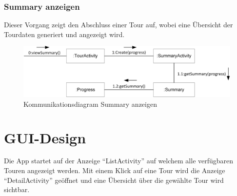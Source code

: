 \documentclass[a4paper,10pt,xetex]{article}
\begin{document}
\subsubsection{Summary anzeigen}
Dieser Vorgang zeigt den Abschluss einer Tour auf, wobei eine Übersicht der Tourdaten
generiert und angezeigt wird.
\begin{figure}
  \includegraphics{Kommunikationsdiagramm_SummaryActivity}
  \caption{Kommunikationsdiagram Summary anzeigen}
\end{figure}

\newpage
\section{GUI-Design}\label{gui-design}
Die App startet auf der Anzeige ``ListActivity'' auf welchem alle verfügbaren Touren angezeigt
werden. Mit einem Klick auf eine Tour wird die Anzeige ``DetailActivity'' geöffnet und eine
Übersicht über die gewählte Tour wird sichtbar.
\end{document}
